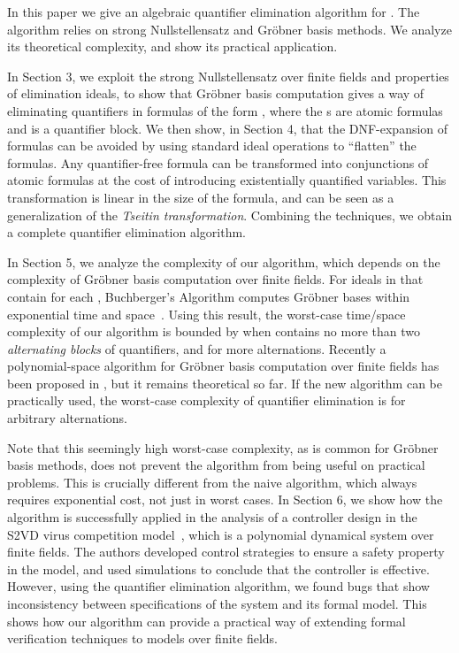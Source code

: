 \documentclass[envcountsect]{llncs}
\begin{document}
In this paper we give an algebraic quantifier elimination algorithm for . The algorithm relies on strong Nullstellensatz and Gr\"obner basis methods. We analyze its theoretical complexity, and show its practical application. 

In Section 3, we exploit the strong Nullstellensatz over finite fields and properties of elimination ideals, to show that Gr\"obner basis computation gives a way of eliminating quantifiers in formulas of the form , where the s are atomic formulas and  is a quantifier block. We then show, in Section 4, that the DNF-expansion of formulas can be avoided by using standard ideal operations to ``flatten'' the formulas. Any quantifier-free formula can be transformed into conjunctions of atomic formulas at the cost of introducing existentially quantified variables. This transformation is linear in the size of the formula, and can be seen as a generalization of the {\em Tseitin transformation}. Combining the techniques, we obtain a complete quantifier elimination algorithm. 

In Section 5, we analyze the complexity of our algorithm, which depends on the complexity of Gr\"obner basis computation over finite fields. For ideals in  that contain  for each , Buchberger's Algorithm computes Gr\"obner bases within exponential time and space~\cite{Lakshman}. Using this result, the worst-case time/space complexity of our algorithm is bounded by  when  contains no more than two {\em alternating blocks} of quantifiers, and  for more alternations. Recently a polynomial-space algorithm for Gr\"obner basis computation over finite fields has been proposed in \cite{pspaceGB}, but it remains theoretical so far. If the new algorithm can be practically used, the worst-case complexity of quantifier elimination is  for arbitrary alternations. 

Note that this seemingly high worst-case complexity, as is common for Gr\"obner basis methods, does not prevent the algorithm from being useful on practical problems. This is crucially different from the naive algorithm, which always requires exponential cost, not just in worst cases. In Section 6, we show how the algorithm is successfully applied in the analysis of a controller design in the S2VD virus competition model~\cite{virus}, which is a polynomial dynamical system over finite fields. The authors developed control strategies to ensure a safety property in the model, and used simulations to conclude that the controller is effective. However, using the quantifier elimination algorithm, we found bugs that show inconsistency between specifications of the system and its formal model. This shows how our algorithm can provide a practical way of extending formal verification techniques to models over finite fields.
\end{document}
